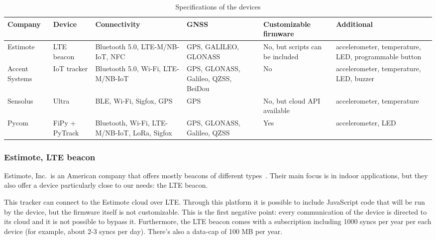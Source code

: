 \begin{table}[htbp]
\centering
{}
\begin{tabularx}{\textwidth}{YYYYYY}
\toprule
\textbf{Company}        & \textbf{Device}         & \textbf{Connectivity}                                                          & \textbf{GNSS}                                & \textbf{Customizable firmware}           & \textbf{Additional}                                           \\ \midrule
Estimote       & LTE beacon     & Bluetooth 5.0, LTE-M/NB-IoT, NFC                                      & GPS, GALILEO, GLONASS               & No, but scripts can be included & accelerometer, temperature, LED, programmable button \\ \midrule
Accent Systems & IoT tracker    & Bluetooth 5.0, Wi-Fi, LTE-M/NB-IoT                                    & GPS, GLONASS, Galileo, QZSS, BeiDou & No                              & accelerometer, temperature, LED, buzzer              \\ \midrule
Sensolus       & Ultra          & BLE, Wi-Fi, Sigfox, GPS                                               & GPS                                 & No, but cloud API available     & accelerometer, temperature                           \\ \midrule
Pycom          & FiPy + PyTrack & Bluetooth, Wi-Fi, LTE-M/NB-IoT, LoRa, Sigfox & GPS, GLONASS, Galileo, QZSS         & Yes                             & accelerometer, LED                                   \\ \bottomrule
\end{tabularx}
\caption{Specifications of the devices}
\label{table_devices}
\end{table}

\subsubsection{Estimote, LTE beacon}
Estimote, Inc.\ is an American company that offers mostly beacons of different types~\cite{estimote}. Their main focus is in indoor applications, but they also offer a device particularly close to our needs: the LTE beacon.

This tracker can connect to the Estimote cloud over LTE. Through this platform it is possible to include JavaScript code that will be run by the device, but the firmware itself is not customizable. This is the first negative point: every communication of the device is directed to its cloud and it is not possible to bypass it. Furthermore, the LTE beacon comes with a subscription including 1000 syncs per year per each device (for example, about 2-3 syncs per day). There’s also a data-cap of 100 MB per year.

